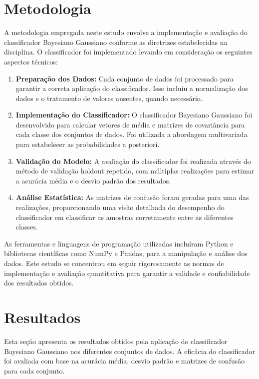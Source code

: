 \documentclass[12pt, a4paper]{report}
\begin{document}
\chapter{Metodologia}

A metodologia empregada neste estudo envolve a implementação e avaliação do classificador Bayesiano Gaussiano conforme as diretrizes estabelecidas na disciplina. O classificador foi implementado levando em consideração os seguintes aspectos técnicos:

\begin{enumerate}
    \item \textbf{Preparação dos Dados:} Cada conjunto de dados foi processado para garantir a correta aplicação do classificador. Isso incluiu a normalização dos dados e o tratamento de valores ausentes, quando necessário.
    \item \textbf{Implementação do Classificador:} O classificador Bayesiano Gaussiano foi desenvolvido para calcular vetores de média e matrizes de covariância para cada classe dos conjuntos de dados. Foi utilizada a abordagem multivariada para estabelecer as probabilidades a posteriori.
    \item \textbf{Validação do Modelo:} A avaliação do classificador foi realizada através do método de validação holdout repetido, com múltiplas realizações para estimar a acurácia média e o desvio padrão dos resultados.
    \item \textbf{Análise Estatística:} As matrizes de confusão foram geradas para uma das realizações, proporcionando uma visão detalhada do desempenho do classificador em classificar as amostras corretamente entre as diferentes classes.
\end{enumerate}

As ferramentas e linguagens de programação utilizadas incluíram Python e bibliotecas científicas como NumPy e Pandas, para a manipulação e análise dos dados. Este estudo se concentrou em seguir rigorosamente as normas de implementação e avaliação quantitativa para garantir a validade e confiabilidade dos resultados obtidos.


\chapter{Resultados}

Esta seção apresenta os resultados obtidos pela aplicação do classificador Bayesiano Gaussiano nos diferentes conjuntos de dados. A eficácia do classificador foi avaliada com base na acurácia média, desvio padrão e matrizes de confusão para cada conjunto.
\end{document}
